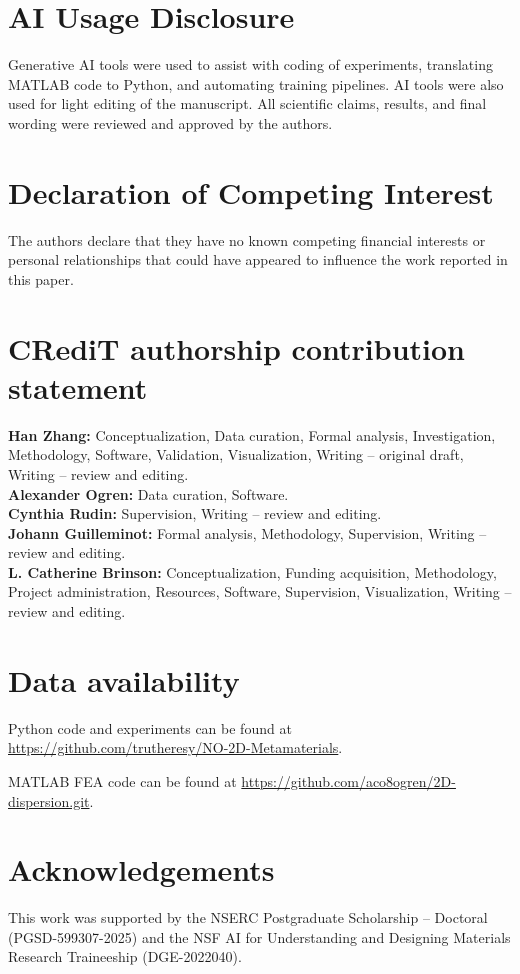 \documentclass[preprint,review,12pt,numafflabel]{elsarticle}
\begin{document}
\section*{AI Usage Disclosure}
Generative AI tools were used to assist with coding of experiments, translating MATLAB code to Python, and automating training pipelines. AI tools were also used for light editing of the manuscript. All scientific claims, results, and final wording were reviewed and approved by the authors.

\section*{Declaration of Competing Interest}
The authors declare that they have no known competing financial interests or personal relationships that could have appeared to influence the work reported in this paper.

\section*{CRediT authorship contribution statement}
\noindent\textbf{Han Zhang:} Conceptualization, Data curation, Formal analysis, Investigation, Methodology, Software, Validation, Visualization, Writing -- original draft, Writing -- review and editing.\\
\noindent\textbf{Alexander Ogren:} Data curation, Software.\\
\noindent\textbf{Cynthia Rudin:} Supervision, Writing -- review and editing.\\
\noindent\textbf{Johann Guilleminot:} Formal analysis, Methodology, Supervision, Writing -- review and editing.\\
\noindent\textbf{L. Catherine Brinson:} Conceptualization, Funding acquisition, Methodology, Project administration, Resources, Software, Supervision, Visualization, Writing -- review and editing.

\section*{Data availability}
\label{sec:Repository}
Python code and experiments can be found at
\url{https://github.com/trutheresy/NO-2D-Metamaterials}.

MATLAB FEA code can be found at
\url{https://github.com/aco8ogren/2D-dispersion.git}.

\section*{Acknowledgements}
This work was supported by the NSERC Postgraduate Scholarship -- Doctoral (PGSD-599307-2025) and the NSF AI for Understanding and Designing Materials Research Traineeship (DGE-2022040).
\end{document}
